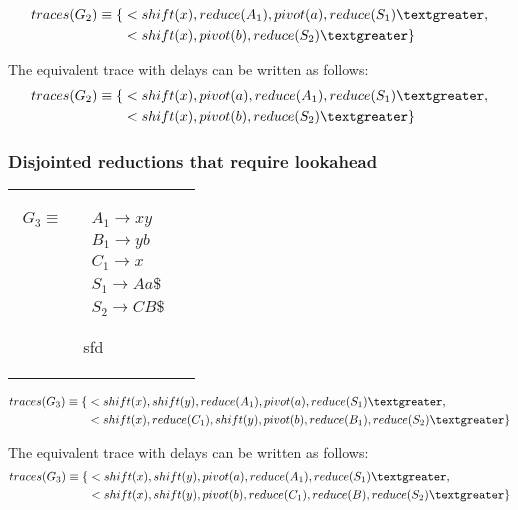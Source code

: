 \documentclass[11pt]{article}
\begin{document}
\begin{align*}
traces(G_2) \equiv \{ & \textless shift(x), reduce(A_1), pivot(a), reduce(S_1) \textgreater,\\
                      & \textless shift(x), pivot(b), reduce(S_2) \textgreater \}
\end{align*}

The equivalent trace with delays can be written as follows:
\begin{align*}
traces(G_2) \equiv \{ & \textless shift(x), pivot(a), reduce(A_1), reduce(S_1) \textgreater,\\
                      & \textless shift(x), pivot(b), reduce(S_2) \textgreater \}
\end{align*}

\subsubsection{Disjointed reductions that require lookahead}
\begin{tabular}[t]{cl}
\parbox{.3\textwidth}{
\begin{align*}
G_3 \equiv \quad & A_1 \rightarrow x y\\
                 & B_1 \rightarrow y b\\
                 & C_1 \rightarrow x\\
                 & S_1 \rightarrow A a \$\\
                 & S_2 \rightarrow C B \$
\end{align*}}
\parbox{.8\textwidth}{sfd}
\end{tabular}

\begin{align*}
traces(G_3) \equiv \{ & \textless shift(x), shift(y), reduce(A_1), pivot(a), reduce(S_1) \textgreater,\\
                      & \textless shift(x), reduce(C_1), shift(y), pivot(b), reduce(B_1), reduce(S_2) \textgreater \}
\end{align*}

The equivalent trace with delays can be written as follows:
\begin{align*}
traces(G_3) \equiv \{ & \textless shift(x), shift(y), pivot(a), reduce(A_1), reduce(S_1) \textgreater,\\
                      & \textless shift(x), shift(y), pivot(b), reduce(C_1), reduce(B), reduce(S_2) \textgreater \}
\end{align*}
\end{document}
